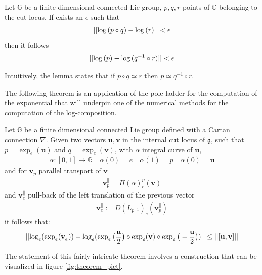 \begin{lemma}
	Let $\mathbb{G}$ be a finite dimensional connected Lie group, $p,q,r$ points of $\mathbb{G}$ belonging to the cut locus. If exists an $\epsilon$ such that 
	\begin{align*}
		\vert\lvert \log{(p\circ q)}  - \log{(r)} \rvert\vert< \epsilon
	\end{align*}
	then it follows
	\begin{align*}
	\vert\lvert \log{(p)}  - \log{(q^{-1} \circ r)} \rvert\vert< \epsilon
	\end{align*}
\end{lemma}
Intuitively, the lemma states that if $p\circ q \simeq r $ then $p \simeq q^{-1} \circ r $.

The following theorem is an application of the pole ladder \cite{lorenzi2011schild} for the computation of the exponential that will underpin one of the numerical methods for the computation of the log-composition.
\begin{theorem}\label{th:local_approximation_theorem}
	Let $\mathbb{G}$ be a finite dimensional connected Lie group defined with a Cartan connection $\nabla$. 
	Given two vectors $\mathbf{u}, \mathbf{v}$ in the internal cut locus of $\mathfrak{g}$, such that 
	$p = \exp_{e}(\mathbf{u}) $ and	$q = \exp_{e}(\mathbf{v})$, with $\alpha$ integral curve of $\mathbf{u}$,
	\begin{align*}
	\alpha : [0,1] \rightarrow \mathbb{G} \quad \alpha(0) = e  \quad \alpha(1) = p \quad
	\dot{\alpha}(0) = \mathbf{u}
	\end{align*}
	and for $\mathbf{v}_{p}^{\parallel}$ parallel transport of $\mathbf{v}$
	\begin{align*}
	\mathbf{v}_{p}^{\parallel} =  \Pi(\alpha)_{e}^{p}(\mathbf{v})
	\end{align*}
	and $\mathbf{v}_{e}^{\parallel}$ pull-back of the left translation of  the previous vector
	\begin{align*}
	 \mathbf{v}_{e}^{\parallel} := D(L_{p^{-1}})_{e}( \mathbf{v}_{p}^{\parallel})
	\end{align*}
	it follows that:
	\begin{align*}
		\vert\lvert 
			\log_{e}(\exp_{e}(\mathbf{v}_{e}^{\parallel} ))
			-
			\log_{e}(\exp_{e}\big(\frac{\mathbf{u}}{2}\big)   
				\circ  \exp_{e}(\mathbf{v}) 
				\circ \exp_{e}\big(-\frac{\mathbf{u}}{2}\big))
			 \rvert\vert \leq\vert\lvert [\mathbf{u}, \mathbf{v}] \rvert\vert
	\end{align*}
\end{theorem}
The statement of this fairly intricate theorem involves a construction that can be visualized in figure \ref{fig:theorem_pict}.

